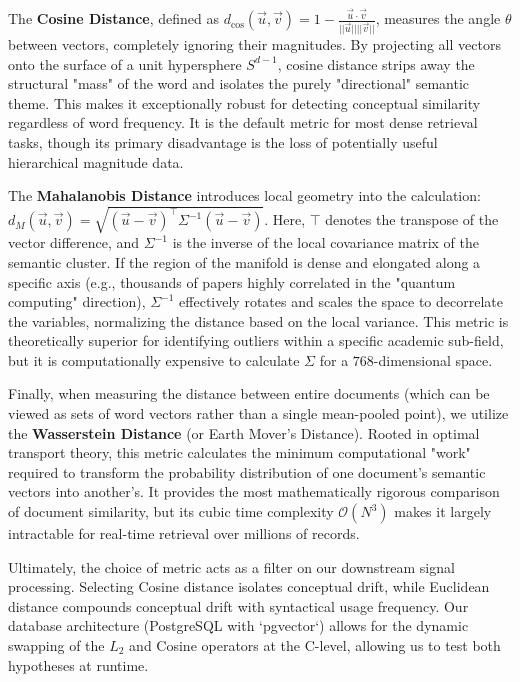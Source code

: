 The \textbf{Cosine Distance}, defined as $d_{\cos}(\vec{u}, \vec{v}) = 1 - \frac{\vec{u} \cdot \vec{v}}{||\vec{u}|| ||\vec{v}||}$, measures the angle $\theta$ between vectors, completely ignoring their magnitudes. By projecting all vectors onto the surface of a unit hypersphere $S^{d-1}$, cosine distance strips away the structural "mass" of the word and isolates the purely "directional" semantic theme. This makes it exceptionally robust for detecting conceptual similarity regardless of word frequency. It is the default metric for most dense retrieval tasks, though its primary disadvantage is the loss of potentially useful hierarchical magnitude data.

The \textbf{Mahalanobis Distance} introduces local geometry into the calculation: $d_M(\vec{u}, \vec{v}) = \sqrt{(\vec{u} - \vec{v})^\top \Sigma^{-1} (\vec{u} - \vec{v})}$. Here, $\top$ denotes the transpose of the vector difference, and $\Sigma^{-1}$ is the inverse of the local covariance matrix of the semantic cluster. If the region of the manifold is dense and elongated along a specific axis (e.g., thousands of papers highly correlated in the "quantum computing" direction), $\Sigma^{-1}$ effectively rotates and scales the space to decorrelate the variables, normalizing the distance based on the local variance. This metric is theoretically superior for identifying outliers within a specific academic sub-field, but it is computationally expensive to calculate $\Sigma$ for a $768$-dimensional space.

Finally, when measuring the distance between entire documents (which can be viewed as sets of word vectors rather than a single mean-pooled point), we utilize the \textbf{Wasserstein Distance} (or Earth Mover's Distance). Rooted in optimal transport theory, this metric calculates the minimum computational "work" required to transform the probability distribution of one document's semantic vectors into another's. It provides the most mathematically rigorous comparison of document similarity, but its cubic time complexity $\mathcal{O}(N^3)$ makes it largely intractable for real-time retrieval over millions of records.

Ultimately, the choice of metric acts as a filter on our downstream signal processing. Selecting Cosine distance isolates conceptual drift, while Euclidean distance compounds conceptual drift with syntactical usage frequency. Our database architecture (PostgreSQL with `pgvector`) allows for the dynamic swapping of the $L_2$ and Cosine operators at the C-level, allowing us to test both hypotheses at runtime.


